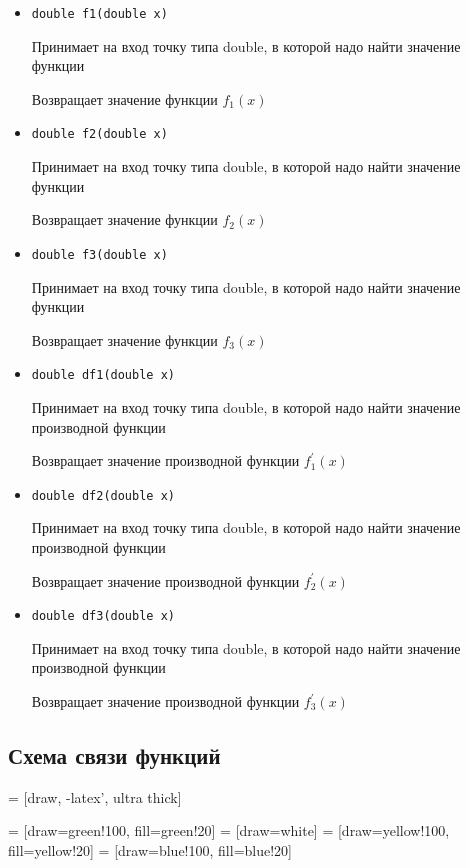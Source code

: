 \documentclass[a4paper,12pt,titlepage,finall]{article}
\begin{document}
\begin{itemize}
\item {\texttt{double f1(double x)}} \par
Принимает на вход точку типа double, в которой надо найти значение функции\par
Возвращает значение функции $f_1(x)$
\item {\texttt{double f2(double x)}} \par
Принимает на вход точку типа double, в которой надо найти значение функции\par
Возвращает значение функции $f_2(x)$
\item {\texttt{double f3(double x)}} \par
Принимает на вход точку типа double, в которой надо найти значение функции\par
Возвращает значение функции $f_3(x)$
\item {\texttt{double df1(double x)}} \par
Принимает на вход точку типа double, в которой надо найти значение производной функции\par
Возвращает значение производной функции $f_1^\prime(x)$
\item {\texttt{double df2(double x)}} \par
Принимает на вход точку типа double, в которой надо найти значение производной функции\par
Возвращает значение производной функции $f_2^\prime(x)$
\item {\texttt{double df3(double x)}} \par
Принимает на вход точку типа double, в которой надо найти значение производной функции\par
Возвращает значение производной функции $f_3^\prime(x)$
\end{itemize}

\newpage


\subsection{Схема связи функций}

 = [draw, -latex', ultra thick]

 = [draw=green!100, fill=green!20]
 = [draw=white]
 = [draw=yellow!100, fill=yellow!20]
 = [draw=blue!100, fill=blue!20]
\end{document}
